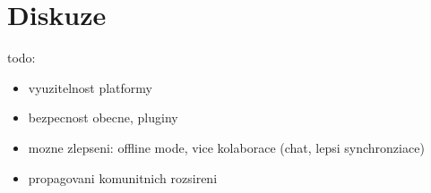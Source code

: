 \chapter{Diskuze}

todo\todo:

\begin{itemize}
    \item vyuzitelnost platformy
    \item bezpecnost obecne, pluginy
    \item mozne zlepseni: offline mode, vice kolaborace (chat, lepsi synchronziace)
    \item propagovani komunitnich rozsireni
\end{itemize}